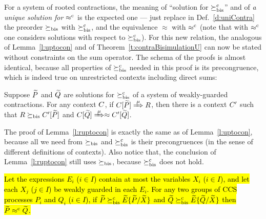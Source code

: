 For a system of rooted contractions, the meaning of 
``solution for $\mathrel{\succeq^{\rm{c}}_{\rm{bis}}}$'' and of \emph{a unique solution for $\mathrel{\approx^{\rm{c}}}$}
is the expected one --- just replace in Def.~\ref{d:uniContra}  the preorder 
$\mathrel{\succeq_{\rm{bis}}}$ with $\mathrel{\succeq^{\rm{c}}_{\rm{bis}}}$, and the equivalence 
$\approx$ with $\mathrel{\approx^{\rm{c}}}$ (note that with $\mathrel{\approx^{\rm{c}}}$ one considers
solutions with respect to  $\mathrel{\succeq^{\rm{c}}_{\rm{bis}}}$).
%
For this new relation, the analogous of Lemma~\ref{l:uptocon} and of
Theorem~\ref{t:contraBisimulationU} can now be stated without constraints on the sum
operator.
The schema of the proofs is almost identical, because all 
properties of $\mathrel{\succeq^{\rm{c}}_{\rm{bis}}}$ needed in this proof is its precongruence, which is
indeed true on unrestricted contexts including direct sums:
\begin{lemma}
\label{l:ruptocon}
Suppose $\widetilde P$ and $\widetilde Q$ are solutions  for $\mathrel{\succeq^{\rm{c}}_{\rm{bis}}}$ 
 of a system of weakly-guarded
contractions.
For any context $C$, 
if  $\ct{\til P}\Arr{\mu}  R$,
 then 
there is a  context $C'$
such that $R \mathrel{\succeq_{\rm{bis}}} C' [\widetilde P]$ and  $\ct{\til Q} \Arr{\mu}
 \wb \ctp{\til Q}$.
\end{lemma}
The proof of Lemma~\ref{l:ruptocon} is exactly the same as of
Lemma~\ref{l:uptocon}, because all we need from $\mathrel{\succeq_{\rm{bis}}}$ and
$\mathrel{\succeq^{\rm{c}}_{\rm{bis}}}$ is their precongruences (in the sense of different
definitions of contexts). Also notice that, the conclusion of
Lemma~\ref{l:ruptocon} still uses $\mathrel{\succeq_{\rm{bis}}}$, because $\mathrel{\succeq^{\rm{c}}_{\rm{bis}}}$ does
not hold.

\begin{theorem}
\label{t:rcontraBisimulationU}
\hl{Let the expressions $E_i$ ($i \in I$) contain at most the
  variables $X_i$ ($i \in I$), and let each $X_j$ ($j\in I$) be weakly
  guarded in each $E_i$. For any two groups of CCS processes $P_i$ and
  $Q_i$ ($i \in I$), if $\widetilde P \mathrel{\succeq^{\rm{c}}_{\rm{bis}}} \widetilde E\{\widetilde P/\widetilde X\}$ and
    $\widetilde Q \mathrel{\succeq^{\rm{c}}_{\rm{bis}}} \widetilde E\{\widetilde Q/\widetilde X\}$ then $\widetilde P \mathrel{\approx^{\rm{c}}} \widetilde Q$.}
\end{theorem}

